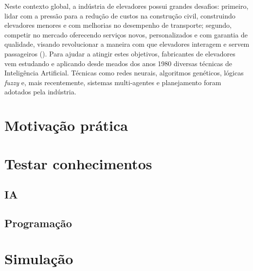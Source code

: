 Neste contexto global, a indústria de elevadores possui grandes desafios: primeiro, lidar com a pressão para a redução de custos na construção civil, construindo elevadores menores e com melhorias no desempenho de transporte; segundo, competir no mercado oferecendo serviços novos, personalizados e com garantia de qualidade, visando revolucionar a maneira com que elevadores interagem e servem passageiros (\cite{KOEHLEROTTIGER02}). Para ajudar a atingir estes objetivos, fabricantes de elevadores vem estudando e aplicando desde meados dos anos 1980 diversas técnicas de Inteligência Artificial. Técnicas como redes neurais, algoritmos genéticos, lógicas \textit{fuzzy} e, mais recentemente, sistemas multi-agentes e planejamento foram adotados pela indústria.

\section{Motivação prática}
\section{Testar conhecimentos}
\subsection{IA}
\subsection{Programação}
\section{Simulação}
